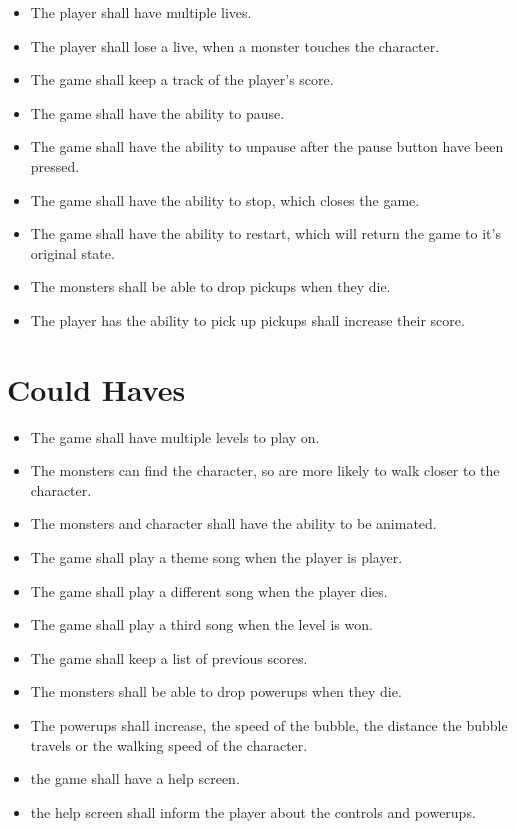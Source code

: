 \begin{itemize}
\itemsep0em 
 \item The player shall have multiple lives.
 \item The player shall lose a live, when a monster touches the character. 
 \item The game shall keep a track of the player's score.
 \item The game shall have the ability to pause.
 \item The game shall have the ability to unpause after the pause button have been pressed.
 \item The game shall have the ability to stop, which closes the game.
 \item The game shall have the ability to restart, which will return the game to it's original state.
 \item The monsters shall be able to drop pickups when they die.
 \item The player has the ability to pick up pickups shall increase their score.
\end{itemize}

\section{Could Haves}

\begin{itemize}
\itemsep0em 
  \item The game shall have multiple levels to play on.
  \item The monsters can find the character, so are more likely to walk closer to the character.
  \item The monsters and character shall have the ability to be animated.
  \item The game shall play a theme song when the player is player.
  \item The game shall play a different song when the player dies.
  \item The game shall play a third song when the level is won.
  \item The game shall keep a list of previous scores.
  \item The monsters shall be able to drop powerups when they die.
  \item The powerups shall increase, the speed of the bubble, the distance the bubble travels or the walking speed of the character.
  \item the game shall have a help screen.
  \item the help screen shall inform the player about the controls and powerups.
\end{itemize}

